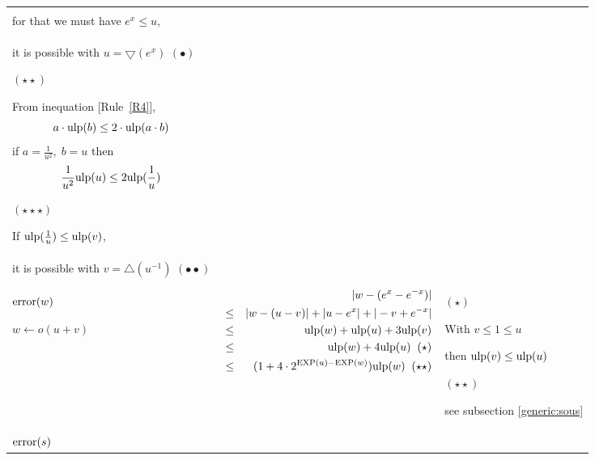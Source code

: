 \documentclass[12pt]{amsart}
\def\pinf{\bigtriangleup}
\def\minf{\bigtriangledown}
\def\ulp{{\rm ulp}}
\def\exp{{\rm EXP}}
\newcommand{\U}[1]{\quad \mbox{[Rule~\ref{#1}]}}
\begin{document}
\begin{center}
\begin{tabular}{l|l |l}
\begin{minipage}{7.5cm}
\end{minipage} &
\begin{minipage}{6cm}

$(\star)$

With $\frac{1}{u} \leq \frac{1}{e^x}$,\\ 
for that we must have $e^x \leq u$,\\
it is possible with $u=\minf(e^x)$ $(\bullet)$

$(\star\star)$

From inequation \U{R4}, 
\[   a \cdot \ulp(b) \leq 2 \cdot \ulp(a \cdot b)\]
if $a =\frac{1}{u^2},\;b = u$ then  
\[ \frac{1}{u^2} \ulp(u)  \leq 2 \ulp(\frac{1}{u})\]

$(\star\star\star)$

If $\ulp(\frac{1}{u}) \leq \ulp(v)$,\\
it is possible with $v=\pinf(u^{-1})$ $(\bullet\bullet)$



\end{minipage}\\\hline
\begin{minipage}{2.5cm}
${\textnormal{error}}(w)$


$w \leftarrow o(u+v) $
\end{minipage} &
\begin{minipage}{7.8cm}



\begin{eqnarray}\nonumber
  &&|w-(e^{x}-e^{-x})| \\\nonumber
  &       \leq&  |w - (u-v)|+|u - e^x|+|-v + e^{-x}|\\\nonumber
  &       \leq& \ulp(w) + \ulp(u) + 3\ulp(v)\\\nonumber
  &       \leq& \ulp(w) + 4\ulp(u)\;\;(\star)\\\nonumber
  &       \leq& (1+ 4 \cdot 2^{\exp(u)-\exp(w)}) \ulp(w)\;\;(\star\star)\\\nonumber
\end{eqnarray}


\end{minipage} &
\begin{minipage}{6cm}

$(\star)$

With $v \leq 1\leq u$ 

then $\ulp(v) \leq \ulp(u)$

$(\star\star)$

see subsection \ref{generic:sous}

\end{minipage}\\\hline
\begin{minipage}{2.5cm}
${\textnormal{error}}(s)$


\end{minipage}
\end{tabular}
\end{center}
\end{document}
